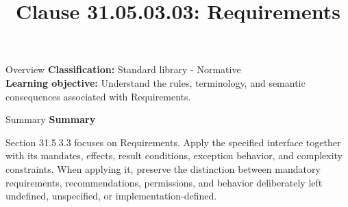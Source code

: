 \documentclass[10pt,letterpaper]{article}
\title{Clause 31.05.03.03: Requirements}
\author{}
\date{}
\begin{document}
\maketitle
\begin{CornellOverviewBox}{Overview}
\textbf{Classification:} Standard library - Normative\\[2pt]
\textbf{Learning objective:} Understand the rules, terminology, and semantic consequences associated with Requirements.
\end{CornellOverviewBox}\begin{CornellSummaryBox}{Summary}
{\sffamily\bfseries\color{Accent} Summary}\par\vspace{3pt}Section 31.5.3.3 focuses on Requirements. Apply the specified interface together with its mandates, effects, result conditions, exception behavior, and complexity constraints. When applying it, preserve the distinction between mandatory requirements, recommendations, permissions, and behavior deliberately left undefined, unspecified, or implementation-defined.
\end{CornellSummaryBox}
\end{document}
